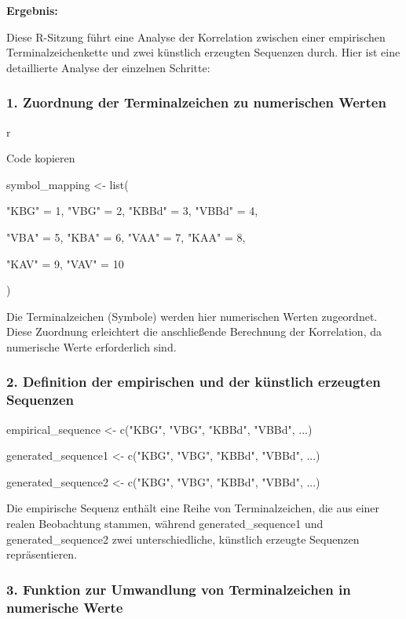 \documentclass[
]{article}
\begin{document}
\textbf{Ergebnis:}

Diese R-Sitzung führt eine Analyse der Korrelation zwischen einer
empirischen Terminalzeichenkette und zwei künstlich erzeugten Sequenzen
durch. Hier ist eine detaillierte Analyse der einzelnen Schritte:

\subsubsection{\texorpdfstring{\textbf{1. Zuordnung der Terminalzeichen
zu numerischen
Werten}}{1. Zuordnung der Terminalzeichen zu numerischen Werten}}\label{zuordnung-der-terminalzeichen-zu-numerischen-werten}

r

Code kopieren

symbol\_mapping \textless- list(

"KBG" = 1, "VBG" = 2, "KBBd" = 3, "VBBd" = 4,

"VBA" = 5, "KBA" = 6, "VAA" = 7, "KAA" = 8,

"KAV" = 9, "VAV" = 10

)

Die Terminalzeichen (Symbole) werden hier numerischen Werten zugeordnet.
Diese Zuordnung erleichtert die anschließende Berechnung der
Korrelation, da numerische Werte erforderlich sind.

\subsubsection{\texorpdfstring{\textbf{2. Definition der empirischen und
der künstlich erzeugten
Sequenzen}}{2. Definition der empirischen und der künstlich erzeugten Sequenzen}}\label{definition-der-empirischen-und-der-kuxfcnstlich-erzeugten-sequenzen}

empirical\_sequence \textless- c("KBG", "VBG", "KBBd", "VBBd", ...)

generated\_sequence1 \textless- c("KBG", "VBG", "KBBd", "VBBd", ...)

generated\_sequence2 \textless- c("KBG", "VBG", "KBBd", "VBBd", ...)

Die empirische Sequenz enthält eine Reihe von Terminalzeichen, die aus
einer realen Beobachtung stammen, während generated\_sequence1 und
generated\_sequence2 zwei unterschiedliche, künstlich erzeugte Sequenzen
repräsentieren.

\subsubsection{\texorpdfstring{\textbf{3. Funktion zur Umwandlung von
Terminalzeichen in numerische
Werte}}{3. Funktion zur Umwandlung von Terminalzeichen in numerische Werte}}\label{funktion-zur-umwandlung-von-terminalzeichen-in-numerische-werte}
\end{document}
